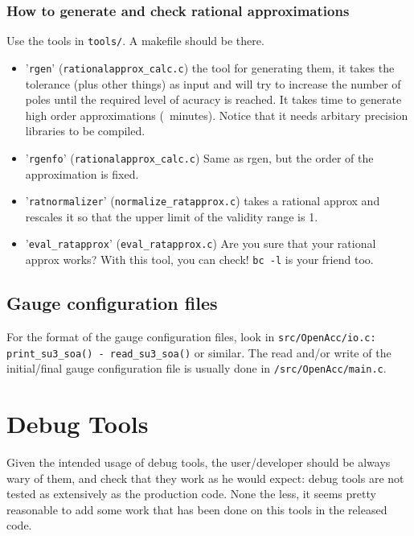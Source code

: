 \documentclass[a4paper,10pt]{book}
\begin{document}
 \subsubsection{ How to generate and check rational approximations}
  Use the tools in \verb|tools/|. A makefile should be there. 
  \begin{itemize}
  \item '\verb|rgen|' (\verb|rationalapprox_calc.c|) 
   the tool for generating them, it takes the tolerance (plus other
   things) as input and will try to increase the number of poles until
   the required level of acuracy is reached. It takes time to generate
   high order approximations (~minutes). Notice that it needs arbitary
   precision libraries to be compiled.
  \item '\verb|rgenfo|' (\verb|rationalapprox_calc.c|) 
   Same as rgen, but the order of the approximation is fixed.
  \item '\verb|ratnormalizer|' (\verb|normalize_ratapprox.c|) 
   takes a rational approx and
   rescales it so that the upper limit of the validity range is 1.
  \item '\verb|eval_ratapprox|' (\verb|eval_ratapprox.c|)
   Are you sure that your rational approx works? With this tool, you
   can check! \verb|bc -l| is your friend too.
 \end{itemize}
 
\subsection{Gauge configuration files}
  For the format of the gauge configuration files, look in 
  \verb|src/OpenAcc/io.c: print_su3_soa() - read_su3_soa()| or similar.
  The read and/or write of the initial/final gauge configuration file
  is usually done in \verb|/src/OpenAcc/main.c|.

\section{Debug Tools}
Given the intended usage of debug tools, the user/developer should be always 
wary of them, and check that they work as he would expect: debug tools are not 
tested as extensively as the production code. None the less, it seems pretty
reasonable to add some work that has been done on this tools in the released 
code.
\end{document}
